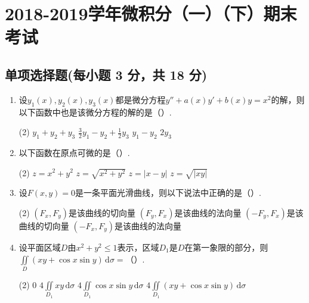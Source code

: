 \documentclass[../main.tex]{subfiles}
\begin{document}
\chapter{2018-2019学年微积分（一）（下）期末考试}

\section{单项选择题(每小题 3 分，共 18 分)}
\begin{enumerate}
    \item 设$y_{1}(x),y_{2}(x),y_{3}(x)$都是微分方程$y''+a(x)y'+b(x)y=x^{2}$的解，则以下函数中也是该微分方程的解的是（\qquad）.

          \begin{tasks}[label=\textbf{\Alph*.}, label-width=1.5em, column-sep=1em](2)
              \task $y_{1}+y_{2}+y_{3}$
              \task $\frac{3}{2} y_{1}- y_{2}+\frac{1}{2}y_{3}$
              \task $y_{1}-y_{2}$
              \task $2y_{3}$
          \end{tasks}

    \item 以下函数在原点可微的是（\qquad）.

          \begin{tasks}[label=\textbf{\Alph*.}, label-width=1.5em, column-sep=1em](2)
              \task $z=x^{2}+y^{2}$
              \task $z=\sqrt{x^{2}+y^{2}}$
              \task $z=|x-y|$
              \task $z=\sqrt{|xy|}$
          \end{tasks}

    \item 设$F(x,y)=0$是一条平面光滑曲线，则以下说法中正确的是（\qquad）.

          \begin{tasks}[label=\textbf{\Alph*.}, label-width=1.5em, column-sep=1em](2)
              \task $(F_{x},F_{y})$是该曲线的切向量
              \task $(F_{y},F_{x})$是该曲线的法向量
              \task $(-F_{y},F_{x})$是该曲线的切向量
              \task $(-F_{x},F_{y})$是该曲线的法向量
          \end{tasks}

    \item 设平面区域$D$由$x^{2}+y^{2}\leq1$表示，区域$D_{1}$是$D$在第一象限的部分，则$\iint\limits_{D}(xy+\cos x\sin y)\,\mathrm{d}\sigma=$（\qquad）.

          \begin{tasks}[label=\textbf{\Alph*.}, label-width=1.5em, column-sep=1em](2)
              \task $0$
              \task $4\iint\limits_{D_{1}}xy\,\mathrm{d}\sigma$
              \task $4\iint\limits_{D_{1}}\cos x\sin y\,\mathrm{d}\sigma$
              \task $4\iint\limits_{D_{1}}(xy+\cos x\sin y)\,\mathrm{d}\sigma$
          \end{tasks}


\end{enumerate}
\end{document}
